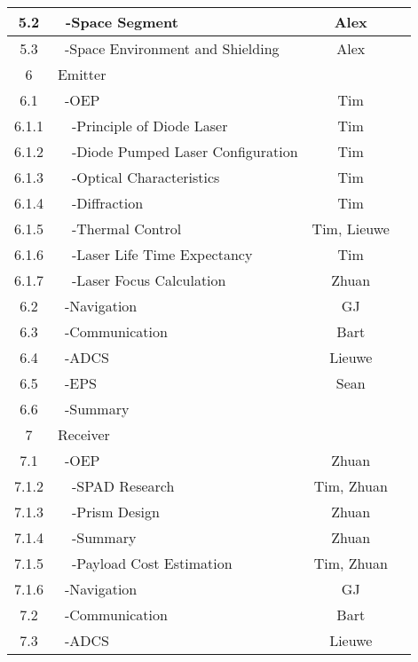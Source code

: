 \begin{table}[ht!]
{\begin{tabular}{|c|l|c|c|}
 5.2     & \ -Space Segment                     & Alex &\\\hline
 5.3     & \ -Space Environment and Shielding   & Alex &\\\hline\hline
 6       & Emitter                              &\\\hline
 6.1     & \ -OEP                               & Tim &\\\hline
 6.1.1   & \ \ -Principle of Diode Laser       & Tim &\\\hline
 6.1.2   & \ \ -Diode Pumped Laser Configuration & Tim &\\\hline
 6.1.3   & \ \ -Optical Characteristics        & Tim &\\\hline
 6.1.4   & \ \ -Diffraction                    & Tim &\\\hline  
 6.1.5   & \ \ -Thermal Control                & Tim, Lieuwe &\\\hline
 6.1.6   & \ \ -Laser Life Time Expectancy     & Tim &\\\hline
 6.1.7   & \ \ -Laser Focus Calculation        & Zhuan &\\\hline
 6.2     & \ -Navigation                        & GJ &\\\hline
 6.3     & \ -Communication                     & Bart &\\\hline
 6.4     & \ -ADCS                              & Lieuwe &\\\hline
 6.5     & \ -EPS                               & Sean &\\\hline
 6.6     & \ -Summary                           &\\\hline\hline
 7       & Receiver                             &\\\hline
 7.1     & \ -OEP                               & Zhuan &\\\hline
 7.1.2   & \ \ -SPAD Research                  & Tim, Zhuan &\\\hline
 7.1.3   & \ \ -Prism Design                   & Zhuan &\\\hline
 7.1.4   & \ \ -Summary                        & Zhuan &\\\hline
 7.1.5   & \ \ -Payload Cost Estimation        & Tim, Zhuan &\\\hline
 7.1.6   & \ -Navigation                        & GJ &\\\hline
 7.2     & \ -Communication                     & Bart &\\\hline
 7.3     & \ -ADCS                              & Lieuwe &\\\hline

\end{tabular}}
\end{table}
